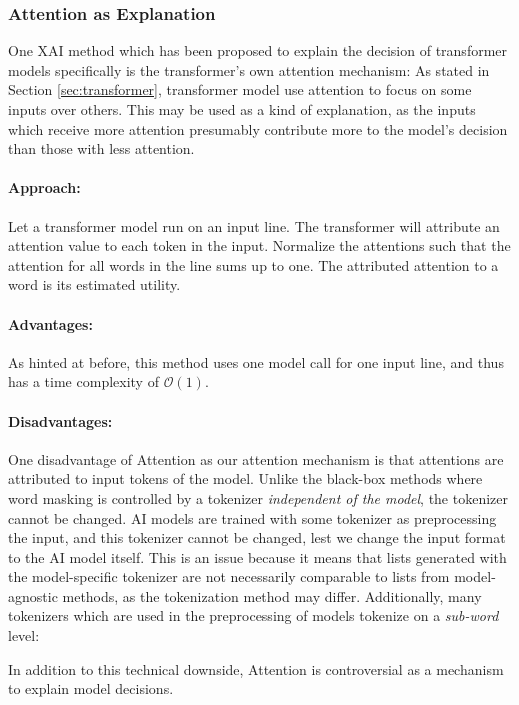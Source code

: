 \subsubsection{Attention as Explanation}
One XAI method which has been proposed to explain the decision of transformer models specifically is the transformer's own attention mechanism:
As stated in Section \ref{sec:transformer}, transformer model use attention to focus on some inputs over others.
This may be used as a kind of explanation, as the inputs which receive more attention presumably contribute more to the model's decision than those with less attention.

\paragraph{Approach:}
Let a transformer model run on an input line.
The transformer will attribute an attention value to each token in the input.
Normalize the attentions such that the attention for all words in the line sums up to one.
The attributed attention to a word is its estimated utility.

\paragraph{Advantages:}
As hinted at before, this method uses one model call for one input line, and thus has a time complexity of $\mathcal{O}(1)$.


\paragraph{Disadvantages:}
One disadvantage of Attention as our attention mechanism is that attentions are attributed to input tokens of the model.
Unlike the black-box methods where word masking is controlled by a tokenizer \textit{independent of the model}, the tokenizer cannot be changed.
AI models are trained with some tokenizer as preprocessing the input, and this tokenizer cannot be changed, lest we change the input format to the AI model itself.
This is an issue because it means that lists generated with the model-specific tokenizer are not necessarily comparable to lists from model-agnostic methods, as the tokenization method may differ.
Additionally, many tokenizers which are used in the preprocessing of models tokenize on a \textit{sub-word} level:

In addition to this technical downside, Attention is controversial as a mechanism to explain model decisions.

